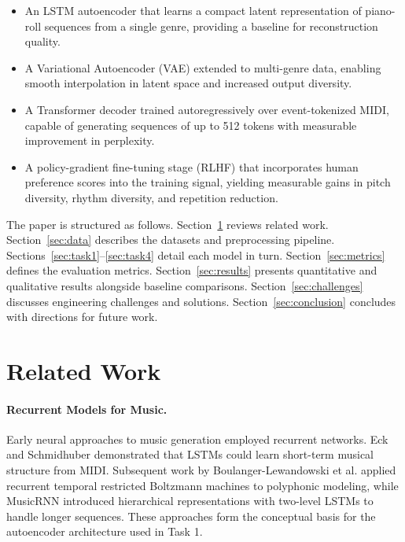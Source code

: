 \documentclass{article}
\begin{document}
\begin{itemize}
  \item An LSTM autoencoder that learns a compact latent representation of piano-roll sequences from a single genre, providing a baseline for reconstruction quality.
  \item A Variational Autoencoder (VAE) extended to multi-genre data, enabling smooth interpolation in latent space and increased output diversity.
  \item A Transformer decoder trained autoregressively over event-tokenized MIDI, capable of generating sequences of up to 512 tokens with measurable improvement in perplexity.
  \item A policy-gradient fine-tuning stage (RLHF) that incorporates human preference scores into the training signal, yielding measurable gains in pitch diversity, rhythm diversity, and repetition reduction.
\end{itemize}

The paper is structured as follows. Section~\ref{sec:related} reviews related work. Section~\ref{sec:data} describes the datasets and preprocessing pipeline. Sections~\ref{sec:task1}--\ref{sec:task4} detail each model in turn. Section~\ref{sec:metrics} defines the evaluation metrics. Section~\ref{sec:results} presents quantitative and qualitative results alongside baseline comparisons. Section~\ref{sec:challenges} discusses engineering challenges and solutions. Section~\ref{sec:conclusion} concludes with directions for future work.

\section{Related Work}
\label{sec:related}

\paragraph{Recurrent Models for Music.}
Early neural approaches to music generation employed recurrent networks. Eck and Schmidhuber \cite{eck2002finding} demonstrated that LSTMs could learn short-term musical structure from MIDI. Subsequent work by Boulanger-Lewandowski et al. \cite{boulanger2012modeling} applied recurrent temporal restricted Boltzmann machines to polyphonic modeling, while MusicRNN \cite{roberts2018hierarchical} introduced hierarchical representations with two-level LSTMs to handle longer sequences. These approaches form the conceptual basis for the autoencoder architecture used in Task 1.
\end{document}
